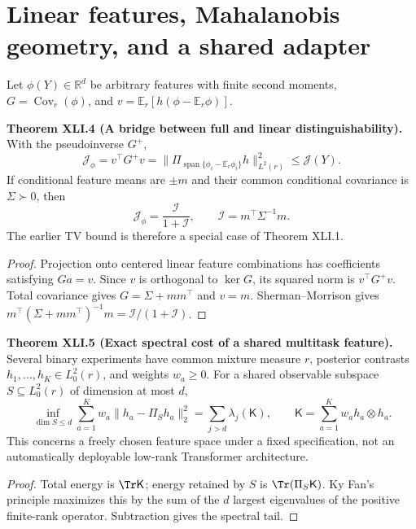 \documentclass[11pt,a4paper,oneside]{book}
\newcommand{\R}{\mathbb R}\newcommand{\C}{\mathbb C}\newcommand{\Z}{\mathbb Z}\newcommand{\N}{\mathbb N}\newcommand{\Q}{\mathbb Q}
\newcommand{\statement}[3]{\par\medskip\noindent\textbf{#1 #2 (#3).}\ }
\begin{document}
\section{Linear features, Mahalanobis geometry, and a shared adapter}
Let $\phi(Y)\in\R^d$ be arbitrary features with finite second moments, $G=\operatorname{Cov}_r(\phi)$, and $v=\mathbb E_r[h(\phi-\mathbb E_r\phi)]$.
\statement{Theorem}{XLI.4}{A bridge between full and linear distinguishability}
With the pseudoinverse $G^+$,
\begin{equation}\mathcal J_\phi=v^\top G^+v=\|\Pi_{\operatorname{span}\{\phi_i-\mathbb E_r\phi_i\}}h\|_{L^2(r)}^2\le\mathcal J(Y).\tag{170}\end{equation}
If conditional feature means are $\pm m$ and their common conditional covariance is $\Sigma\succ0$, then
\begin{equation}\mathcal J_\phi=\frac{\mathcal I}{1+\mathcal I},\qquad\mathcal I=m^\top\Sigma^{-1}m.\tag{171}\end{equation}
The earlier TV bound is therefore a special case of Theorem XLI.1.
\begin{proof}
Projection onto centered linear feature combinations has coefficients satisfying $Ga=v$. Since $v$ is orthogonal to $\ker G$, its squared norm is $v^\top G^+v$. Total covariance gives $G=\Sigma+mm^\top$ and $v=m$. Sherman--Morrison gives $m^\top(\Sigma+mm^\top)^{-1}m=\mathcal I/(1+\mathcal I)$.
\end{proof}
\statement{Theorem}{XLI.5}{Exact spectral cost of a shared multitask feature}
Several binary experiments have common mixture measure $r$, posterior contrasts $h_1,\ldots,h_K\in L^2_0(r)$, and weights $w_a\ge0$. For a shared observable subspace $S\subseteq L^2_0(r)$ of dimension at most $d$,
\begin{equation}\inf_{\dim S\le d}\sum_{a=1}^Kw_a\|h_a-\Pi_Sh_a\|_2^2=\sum_{j>d}\lambda_j(\mathsf K),\qquad\mathsf K=\sum_{a=1}^Kw_ah_a\otimes h_a.\tag{172}\end{equation}
This concerns a freely chosen feature space under a fixed specification, not an automatically deployable low-rank Transformer architecture.
\begin{proof}
Total energy is $\Tr\mathsf K$; energy retained by $S$ is $\Tr(\Pi_S\mathsf K)$. Ky Fan's principle maximizes this by the sum of the $d$ largest eigenvalues of the positive finite-rank operator. Subtraction gives the spectral tail.
\end{proof}
\end{document}
